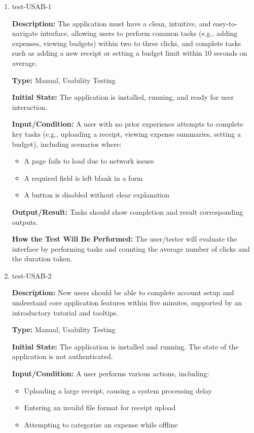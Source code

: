 \documentclass[12pt, titlepage]{article}
\begin{document}
\begin{enumerate}

\item{test-USAB-1\\}

\textbf{Description:} The application must have a clean, intuitive, and
easy-to-navigate interface, allowing users to perform common tasks (e.g., adding
expenses, viewing budgets) within two to three clicks, and complete tasks such
as adding a new receipt or setting a budget limit within 10 seconds on average.

\textbf{Type:} Manual, Usability Testing
					
\textbf{Initial State:} The application is installed, running, and ready for user interaction.
					
\textbf{Input/Condition:} A user with no prior experience attempts to complete key tasks (e.g., uploading a receipt, viewing expense summaries, setting a budget), 
including scenarios where:
  \begin{itemize}
      \item A page fails to load due to network issues
      \item A required field is left blank in a form
      \item A button is disabled without clear explanation
  \end{itemize}
					
\textbf{Output/Result:} Tasks should show completion and result corresponding
outputs.
					
\textbf{How the Test Will Be Performed:} The user/tester will evaluate the
interface by performing tasks and counting the average number of clicks and the
duration taken.

\item{test-USAB-2\\}

\textbf{Description:} New users should be able to complete account setup and
understand core application features within five minutes, supported by an
introductory tutorial and tooltips.

\textbf{Type:} Manual, Usability Testing
					
\textbf{Initial State:} The application is installed and running. The state of
the application is not authenticated.
					
\textbf{Input/Condition:} A user performs various actions, including:
  \begin{itemize}
      \item Uploading a large receipt, causing a system processing delay
      \item Entering an invalid file format for receipt upload
      \item Attempting to categorize an expense while offline
  \end{itemize}
					

\end{enumerate}
\end{document}
